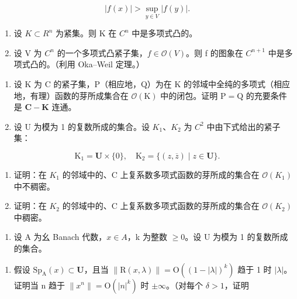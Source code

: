 \[
| f (x) | > \sup _ {y \in V} | f (y) |.
\]

\begin{enumerate}
\def\labelenumi{\alph{enumi})}
\setcounter{enumi}{1}
\item
  设 \(K \subset R^{n}\) 为紧集。则 K 在 \(C^{n}\) 中是多项式凸的。
\item
  设 V 为 \(C^{n}\) 的一个多项式凸紧子集，\(f \in \mathcal{O}(V)\)。则 f 的图象在 \(C^{n+1}\) 中是多项式凸的。（利用 Oka–Weil 定理。）
\end{enumerate}

\begin{enumerate}
\def\labelenumi{\arabic{enumi})}
\setcounter{enumi}{13}
\item
  设 K 为 C 的紧子集，P（相应地，Q）为在 K 的邻域中全纯的多项式（相应地，有理）函数的芽所成集合在 \(\mathcal{O}(\mathrm{K})\) 中的闭包。证明 \(\mathrm{P} = \mathrm{Q}\) 的充要条件是 \(\mathbf{C} - \mathbf{K}\) 连通。
\item
  设 U 为模为 1 的复数所成的集合。设 \(K_{1}\)、\(K_{2}\) 为 \(C^{2}\) 中由下式给出的紧子集：
\end{enumerate}

\[
\mathrm{K} _ {1} = \mathbf {U} \times \{0 \}, \quad \mathrm{K} _ {2} = \{(z, \overline {{z}}) \mid z \in \mathbf {U} \}.
\]

\begin{enumerate}
\def\labelenumi{\alph{enumi})}
\item
  证明：在 \(K_{1}\) 的邻域中的、C 上复系数多项式函数的芽所成的集合在 \(\mathcal{O}(K_{1})\) 中不稠密。
\item
  证明：在 \(K_{2}\) 的邻域中的、C 上复系数多项式函数的芽所成的集合在 \(\mathcal{O}(K_{2})\) 中稠密。
\end{enumerate}

\begin{enumerate}
\def\labelenumi{\arabic{enumi})}
\setcounter{enumi}{15}
\tightlist
\item
  设 A 为幺 Banach 代数，\(x \in A\)，k 为整数 \(\geqslant 0\)。设 U 为模为 1 的复数所成的集合。
\end{enumerate}

\begin{enumerate}
\def\labelenumi{\alph{enumi})}
\tightlist
\item
  假设 \(\mathrm{Sp}_{\mathrm{A}}(x)\subset\mathbf{U}\)，且当 \(\|\mathrm{R}(x,\lambda)\|=\mathrm{O}((1-|\lambda|)^{k})\) 趋于 1 时 \(|\lambda|\)。证明当 n 趋于 \(\|x^{n}\|=\mathrm{O}(|n|^{k})\) 时 \(\pm\infty\)。（对每个 \(\delta>1\)，证明
\end{enumerate}

